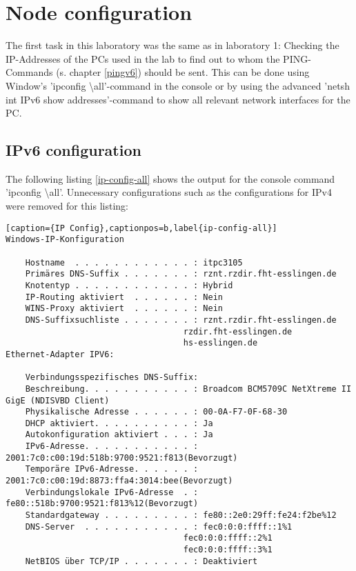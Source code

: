 \section{Node configuration}
The first task in this laboratory was the same as in laboratory 1: Checking the IP-Addresses of the PCs used in the lab to find out to whom the PING-Commands (s. chapter \ref{pingv6}) should be sent. This can be done using Window's 'ipconfig \textbackslash all'-command in the console or by using the advanced 'netsh int IPv6 show addresses'-command to show all relevant network interfaces for the PC.
\subsection{IPv6 configuration}
The following listing \ref{ip-config-all} shows the output for the console command 'ipconfig \textbackslash all'. Unnecessary configurations such as the configurations for IPv4 were removed for this listing:
\\ 
\begin{lstlisting}[caption={IP Config},captionpos=b,label{ip-config-all}]
Windows-IP-Konfiguration

	Hostname  . . . . . . . . . . . . : itpc3105
	Primäres DNS-Suffix . . . . . . . : rznt.rzdir.fht-esslingen.de
	Knotentyp . . . . . . . . . . . . : Hybrid
	IP-Routing aktiviert  . . . . . . : Nein
	WINS-Proxy aktiviert  . . . . . . : Nein
	DNS-Suffixsuchliste . . . . . . . : rznt.rzdir.fht-esslingen.de
									rzdir.fht-esslingen.de
									hs-esslingen.de
Ethernet-Adapter IPV6:

	Verbindungsspezifisches DNS-Suffix:
	Beschreibung. . . . . . . . . . . : Broadcom BCM5709C NetXtreme II GigE (NDISVBD Client)
	Physikalische Adresse . . . . . . : 00-0A-F7-0F-68-30
	DHCP aktiviert. . . . . . . . . . : Ja
	Autokonfiguration aktiviert . . . : Ja
	IPv6-Adresse. . . . . . . . . . . : 2001:7c0:c00:19d:518b:9700:9521:f813(Bevorzugt)
	Temporäre IPv6-Adresse. . . . . . : 2001:7c0:c00:19d:8873:ffa4:3014:bee(Bevorzugt)
	Verbindungslokale IPv6-Adresse  . : fe80::518b:9700:9521:f813%12(Bevorzugt)
	Standardgateway . . . . . . . . . : fe80::2e0:29ff:fe24:f2be%12
	DNS-Server  . . . . . . . . . . . : fec0:0:0:ffff::1%1
									fec0:0:0:ffff::2%1
									fec0:0:0:ffff::3%1
	NetBIOS über TCP/IP . . . . . . . : Deaktiviert
\end{lstlisting}
